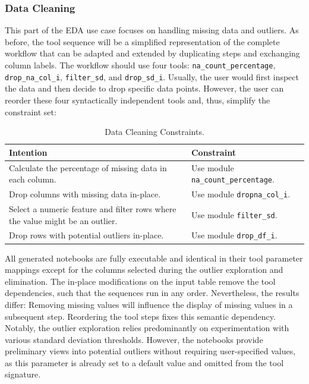 \subsubsection{Data Cleaning}

This part of the EDA use case focuses on handling missing data and outliers. As before, the tool sequence will be a simplified representation of the complete workflow that can be adapted and extended by duplicating steps and exchanging column labels. The workflow should use four tools: \verb|na_count_percentage|, \verb|drop_na_col_i|, \verb|filter_sd|, and \verb|drop_sd_i|. Usually, the user would first inspect the data and then decide to drop specific data points. However, the user can reorder these four syntactically independent tools and, thus, simplify the constraint set:
\begin{table}[h]
\centering
\footnotesize
\begin{tabular}{|p{}|p{}|}
\hline
\textbf{Intention} & \textbf{Constraint} \\
\hline
Calculate the percentage of missing data in each column. & Use module \texttt{na\_count\_percentage}. \\
\hline
Drop columns with missing data in-place. & Use module \texttt{dropna\_col\_i}. \\
\hline
Select a numeric feature and filter rows where the value might be an outlier. & Use module \texttt{filter\_sd}. \\
\hline
Drop rows with potential outliers in-place. & Use module \texttt{drop\_df\_i}. \\
\hline
\end{tabular}
\caption{Data Cleaning Constraints.}
\label{table:native_ape_data_cleaning_constraints}
\end{table}

All generated notebooks are fully executable and identical in their tool parameter mappings except for the columns selected during the outlier exploration and elimination. The in-place modifications on the input table remove the tool dependencies, such that the sequences run in any order. Nevertheless, the results differ: Removing missing values will influence the display of missing values in a subsequent step. Reordering the tool steps fixes this semantic dependency. Notably, the outlier exploration relies predominantly on experimentation with various standard deviation thresholds. However, the notebooks provide preliminary views into potential outliers without requiring user-specified values, as this parameter is already set to a default value and omitted from the tool signature.

